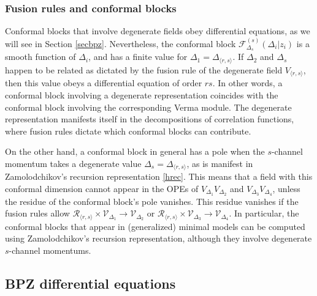 \documentclass[12pt, a4paper, notitlepage, twoside]{report}
\numberwithin{equation}{section}
\theoremstyle{break}
\begin{document}
\subsubsection{Fusion rules and conformal blocks}

Conformal blocks that involve degenerate fields obey differential equations, as we will see in Section \ref{secbpz}.
Nevertheless, the conformal block $\mathcal{F}^{(s)}_{\Delta_s}(\Delta_i|z_i)$ is a smooth function of $\Delta_i$, and has a finite value for $\Delta_1 = \Delta_{\langle r,s\rangle}$. 
If $\Delta_2$ and $\Delta_s$ happen to be related as dictated by the fusion rule of the degenerate field $V_{\langle r,s\rangle}$, then this value obeys a differential equation of order $rs$.
In other words, a conformal block involving a degenerate representation coincides with the conformal block involving the corresponding Verma module.
The degenerate representation manifests itself in the decompositions of correlation functions, where fusion rules dictate which conformal blocks can contribute.

On the other hand, a conformal block in general has a pole when the $s$-channel momentum takes a degenerate value $\Delta_s=\Delta_{\langle r,s\rangle}$, as is manifest in Zamolodchikov's recursion representation \eqref{hrec}.
This means that a field with this conformal dimension cannot appear in the OPEs of $V_{\Delta_1}V_{\Delta_2}$ and $V_{\Delta_3}V_{\Delta_4}$, unless the residue of the conformal block's pole vanishes. 
This residue vanishes if the fusion rules allow $\mathcal{R}_{\langle r,s \rangle}\times \mathcal{V}_{\Delta_1}\to \mathcal{V}_{\Delta_2}$ or $\mathcal{R}_{\langle r,s \rangle}\times \mathcal{V}_{\Delta_3}\to \mathcal{V}_{\Delta_4}$.
In particular, the conformal blocks that appear in (generalized) minimal models can be computed using Zamolodchikov's recursion representation, although they involve degenerate $s$-channel momentums. 


\subsection{BPZ differential equations \label{secbpz}}
\end{document}

